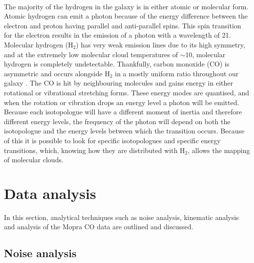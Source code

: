 \documentclass[a4paper, titlepage, oneside]{article}
\newcommand{\molec}[2]{\ensuremath{\text{#1}_{#2}}}
\begin{document}
\begin{multicols}{2}
\paragraph{}
The majority of the hydrogen in the galaxy is in either atomic or molecular form. Atomic hydrogen can emit a photon because of the energy difference between the electron and proton having parallel and anti-parallel spins. This spin transition for the electron results in the emission of a photon with a wavelength of \unit{21}{\centi\metre}. Molecular hydrogen (\molec{H}{2}) has very weak emission lines due to its high symmetry, and at the extremely low molecular cloud temperatures of \(\sim\)\unit{10}{\kelvin}, molecular hydrogen is completely undetectable. Thankfully, carbon monoxide (CO) is asymmetric and occurs alongside \molec{H}{2} in a mostly uniform ratio throughout our galaxy \parencite{Neininger:1998}. The CO is hit by neighbouring molecules and gains energy in either rotational or vibrational stretching forms. These energy modes are quantised, and when the rotation or vibration drops an energy level a photon will be emitted. Because each isotopologue will have a different moment of inertia and therefore different energy levels, the frequency of the photon will depend on both the isotopologue and the energy levels between which the transition occurs. Because of this it is possible to look for specific isotopologues and specific energy transitions, which, knowing how they are distributed with \molec{H}{2}, allows the mapping of molecular clouds.

\section{Data analysis}
\paragraph{}
In this section, analytical techniques such as noise analysis, kinematic analysis and analysis of the Mopra CO data are outlined and discussed.

\subsection{Noise analysis}

\end{multicols}
\end{document}
